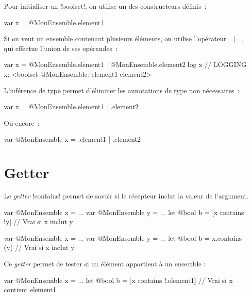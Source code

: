 Pour initialiser un \ggsq!boolset!, on utilise un des constructeurs définis~:
\begin{galgas34}
var x = @MonEnsemble.element1
\end{galgas34}

Si on veut un ensemble contenant plusieurs éléments, on utilise l'opérateur \ggsq=|=, qui effectue l'union de ses opérandes~:
\begin{galgas34}
var x = @MonEnsemble.element1 | @MonEnsemble.element2
log x // LOGGING x: <boolset @MonEnsemble: element1 element2>
\end{galgas34}

L'inférence de type permet d'éliminer les annotations de type non nécessaires~:
\begin{galgas34}
var x = @MonEnsemble.element1 | .element2
\end{galgas34}

Ou encore~:
\begin{galgas34}
var @MonEnsemble x = .element1 | .element2
\end{galgas34}





















\section{Getter}


Le \emph{getter} \ggsq!contains! permet de savoir si le récepteur inclut la valeur de l'argument.


\begin{galgas3}
var @MonEnsemble x = ...
var @MonEnsemble y = ...
let @bool b = [x contains !y] // Vrai si x inclut y
\end{galgas3}

\begin{galgas4}
var @MonEnsemble x = ...
var @MonEnsemble y = ...
let @bool b = x.contains (y) // Vrai si x inclut y
\end{galgas4}

Ce \emph{getter} permet de tester si un élément appartient à un ensemble :
\begin{galgas3}
var @MonEnsemble x = ...
let @bool b = [x contains !.element1] // Vrai si x contient element1
\end{galgas3}

